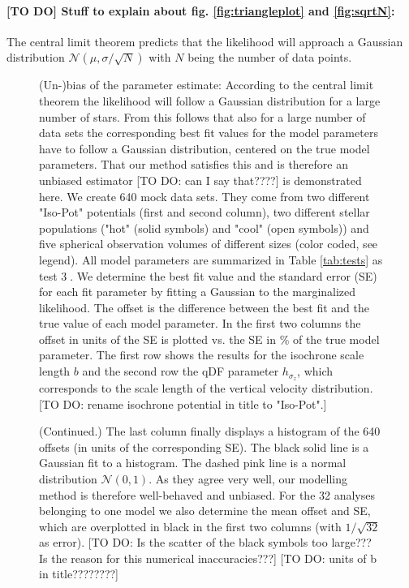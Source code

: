 \paragraph{[TO DO] Stuff to explain about fig. \ref{fig:triangleplot} and \ref{fig:sqrtN}:} The central limit theorem predicts that the likelihood will approach a Gaussian distribution $\mathscr{N}(\mu,\sigma/\sqrt{N})$ with $N$ being the number of data points.




\begin{figure}
\caption{(Un-)bias of the parameter estimate: According to the central limit theorem the likelihood will follow a Gaussian distribution for a large number of stars. From this follows that also for a large number of data sets the corresponding best fit values for the model parameters have to follow a Gaussian distribution, centered on the true model parameters. That our method satisfies this and is therefore an unbiased estimator [TO DO: can I say that????] is demonstrated here. We create 640 mock data sets. They come from two different "Iso-Pot" potentials (first and second column), two different stellar populations ("hot" \MAP (solid symbols) and "cool" \MAP (open symbols)) and five spherical observation volumes of different sizes (color coded, see legend). All model parameters are summarized in Table \ref{tab:tests} as test \textcircled{3}. We determine the best fit value and the standard error (SE) for each fit parameter by fitting a Gaussian to the marginalized likelihood. The offset is the difference between the best fit and the true value of each model parameter. In the first two columns the offset in units of the SE is plotted vs. the SE in \% of the true model parameter. The first row shows the results for the isochrone scale length $b$ and the second row the qDF parameter $h_{\sigma_z}$, which corresponds to the scale length of the vertical velocity distribution. [TO DO: rename isochrone potential in title to "Iso-Pot".]}
\label{fig:centrallimittheorem}
\end{figure}

\addtocounter{figure}{-1}
\begin{figure} [t!]
  \caption{(Continued.) The last column finally displays a histogram of the 640 offsets (in units of the corresponding SE). The black solid line is a Gaussian fit to a histogram. The dashed pink line is a normal distribution $\mathscr{N}(0,1)$. As they agree very well, our modelling method is therefore well-behaved and unbiased. For the 32 analyses belonging to one model we also determine the mean offset and SE, which are overplotted in black in the first two columns (with $1/\sqrt{32}$ as error).  [TO DO: Is the scatter of the black symbols too large??? Is the reason for this numerical inaccuracies???] [TO DO: units of b in title????????]} 
  \end{figure}
  
